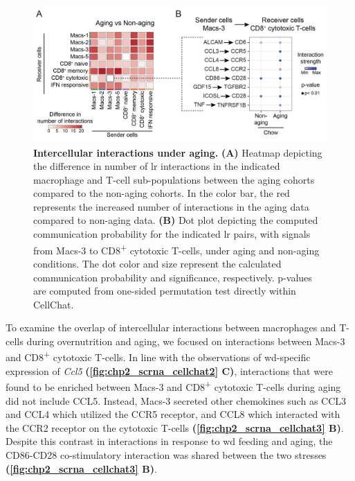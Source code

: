 \begin{figure}[b!]
\centering
\includegraphics[width=\linewidth]{Chapter4/Fig/F2-A1-v3-02.png}
\caption[Intercellular interactions under aging]{\textbf{Intercellular interactions under aging.}
\textbf{(A)} Heatmap depicting the difference in number of \gls{lr} interactions in the indicated macrophage and T-cell sub-populations between the aging cohorts compared to the non-aging cohorts. In the color bar, the red represents the increased number of interactions in the aging data compared to non-aging data. \textbf{(B)} Dot plot depicting the computed communication probability for the indicated \gls{lr} pairs, with signals from Macs-3 to CD8\textsuperscript{+}  cytotoxic T-cells, under aging and non-aging conditions. The dot color and size represent the calculated communication probability and significance, respectively. p-values are computed from one-sided permutation test directly within CellChat.}
\label{fig:chp2_scrna_cellchat3}
\end{figure}

\par To examine the overlap of intercellular interactions between macrophages and T-cells during overnutrition and aging, we focused on interactions between Macs-3 and CD8\textsuperscript{+} cytotoxic T-cells. In line with the observations of \gls{wd}-specific expression of \textit{Ccl5} \textbf{(\autoref{fig:chp2_scrna_cellchat2} C)}, interactions that were found to be enriched between Macs-3 and CD8\textsuperscript{+} cytotoxic T-cells during aging did not include CCL5. Instead, Macs-3 secreted other chemokines such as CCL3 and CCL4 which utilized the CCR5 receptor, and CCL8 which interacted with the CCR2 receptor on the cytotoxic T-cells \textbf{(\autoref{fig:chp2_scrna_cellchat3} B)}. Despite this contrast in interactions in response to \gls{wd} feeding and aging, the CD86-CD28 co-stimulatory interaction was shared between the two stresses \textbf{(\autoref{fig:chp2_scrna_cellchat3} B)}.\\

